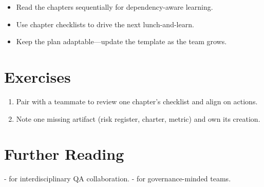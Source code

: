 \begin{itemize}
  \item Read the chapters sequentially for dependency-aware learning.
  \item Use chapter checklists to drive the next lunch-and-learn.
  \item Keep the plan adaptable—update the template as the team grows.
\end{itemize}

\section{Exercises}

\begin{enumerate}
  \item Pair with a teammate to review one chapter’s checklist and align on actions.
  \item Note one missing artifact (risk register, charter, metric) and own its creation.
\end{enumerate}

\section{Further Reading}

- \citep{kaner2002testing} for interdisciplinary QA collaboration.
- \citep{beizer1995software} for governance-minded teams.
